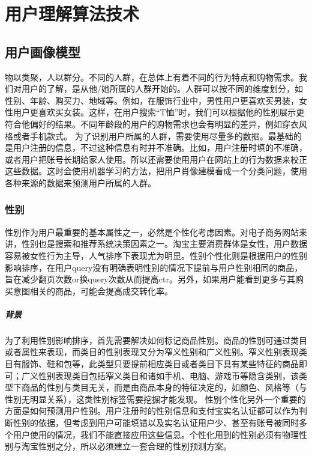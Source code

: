 
\chapter{ 用户理解算法技术 }
\thispagestyle{empty}

\setlength{\fboxrule}{0pt}\setlength{\fboxsep}{0cm}
\noindent\shadowbox{
\begin{tcolorbox}[arc=0mm,colback=lightblue,colframe=darkblue,title=学习目标与要求]

\end{tcolorbox}}
\setlength{\fboxrule}{1pt}\setlength{\fboxsep}{4pt} 

\section{用户画像模型}
物以类聚，人以群分。不同的人群，在总体上有着不同的行为特点和购物需求。我们对用户的了解，是从他/她所属的人群开始的。人群可以按不同的维度划分，如性别、年龄、购买力、地域等。例如，在服饰行业中，男性用户更喜欢买男装，女性用户更喜欢买女装。这样，在用户搜索“T恤”时，我们可以根据他的性别展示更符合他偏好的结果。不同年龄段的用户的购物需求也会有明显的差异，例如穿衣风格或者手机款式。
	为了识别用户所属的人群，需要使用尽量多的数据。最基础的是用户注册的信息，不过这种信息有时并不准确。比如，用户注册时填的不准确，或者用户把账号长期给家人使用。所以还需要使用用户在网站上的行为数据来校正这些数据。这时会使用机器学习的方法，把用户肖像建模看成一个分类问题，使用各种来源的数据来预测用户所属的人群。
	\subsection{性别}
	性别作为用户最重要的基本属性之一，必然是个性化考虑因素。对电子商务网站来讲，性别也是搜索和推荐系统决策因素之一。淘宝主要消费群体是女性，用户数据容易被女性行为主导，人气排序下表现尤为明显。性别个性化则是根据用户的性别影响排序，在用户query没有明确表明性别的情况下提前与用户性别相同的商品，旨在减少翻页次数or换query次数从而提高ctr。另外，如果用户能看到更多与其购买意图相关的商品，可能会提高成交转化率。
	\paragraph{背景}
	为了利用性别影响排序，首先需要解决如何标记商品性别。商品的性别可通过类目或者属性来表现，而类目的性别表现又分为窄义性别和广义性别。窄义性别表现类目有服饰、鞋和包等，此类型只要提前相应类目或者类目下具有某些特征的商品即可；广义性别表现类目包括窄义类目和诸如手机、电脑、游戏币等隐含类别，该类型下商品的性别与类目无关，而是由商品本身的特征决定的，如颜色、风格等（与性别无明显关系），这类性别标签需要挖掘才能发现。
	性别个性化另外一个重要的方面是如何预测用户性别。用户注册时的性别信息和支付宝实名认证都可以作为判断性别的依据，但考虑到用户可能填错以及实名认证用户少、甚至有账号被同时多个用户使用的情况，我们不能直接应用这些信息。个性化用到的性别必须有物理性别与淘宝性别之分，所以必须建立一套合理的性别预测方案。
